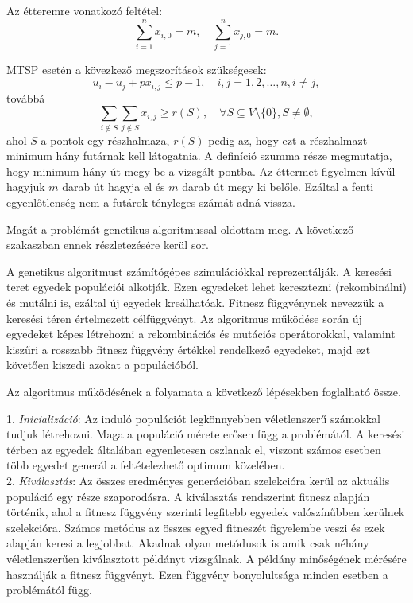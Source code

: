 Az étteremre vonatkozó feltétel:
\[
\displaystyle
\sum_{i=1}^n x_{i, 0} = m, \quad
\sum_{j=1}^n x_{j, 0} = m.
\]

MTSP esetén a kövezkező megszorítások szükségesek:
\[
u_i - u_j + p x_{i,j} \leq p - 1, \quad i, j = 1, 2, \ldots, n, i \neq j,
\]
továbbá
\[
\displaystyle
\sum_{i \notin S} \sum_{j \notin S} x_{i,j} \geq r(S), \quad
\forall S \subseteq V \setminus \{0\}, S \neq \emptyset,
\]
ahol $S$ a pontok egy részhalmaza, $r(S)$ pedig az, hogy ezt a részhalmazt minimum hány futárnak kell látogatnia. A definíció szumma része megmutatja, hogy minimum hány út megy be a vizsgált pontba. Az éttermet figyelmen kívűl hagyjuk $m$ darab út hagyja el és $m$ darab út megy ki belőle. Ezáltal a fenti egyenlőtlenség nem a futárok tényleges számát adná vissza.

Magát a problémát genetikus algoritmussal oldottam meg. A következő szakaszban ennek részletezésére kerül sor.\cite{MTSP2}


A genetikus algoritmust számítógépes szimulációkkal reprezentálják. A keresési teret egyedek populációi alkotják. Ezen egyedeket lehet keresztezni (rekombinálni) és mutálni is, ezáltal új egyedek kreálhatóak. Fitnesz függvénynek nevezzük a keresési téren értel\-mezett célfüggvényt. Az algoritmus működése során új egyedeket képes létrehozni a rekombinációs és mutációs operátorokkal, valamint kiszűri a rosszabb fitnesz függvény értékkel rendelkező egyedeket, majd ezt követően kiszedi azokat a populációból.

Az algoritmus működésének a folyamata a következő lépésekben foglalható össze.

1. \textit{Inicializáció}:  Az induló populációt legkönnyebben véletlenszerű számokkal tudjuk létrehozni. Maga a populáció mérete erősen függ a problémától. A keresési térben az egyedek általában egyenletesen oszlanak el, viszont számos esetben több egyedet generál a feltételezhető optimum közelében. \\

2. \textit{Kiválasztás}: Az összes eredményes generációban szelekcióra kerül az aktuális populáció egy része szaporodásra. A kiválasztás rendszerint fitnesz alapján történik, ahol a fitnesz függvény szerinti legfitebb egyedek valószínűbben kerülnek szelekcióra. Számos metódus az összes egyed fitneszét figyelembe veszi és ezek alapján keresi a legjobbat. Akadnak olyan metódusok is amik csak néhány véletlenszerűen kiválasztott példányt vizsgálnak. A példány minőségének mérésére használják a fitnesz függvényt. Ezen függvény bonyolultsága minden esetben a problémától függ. \\

